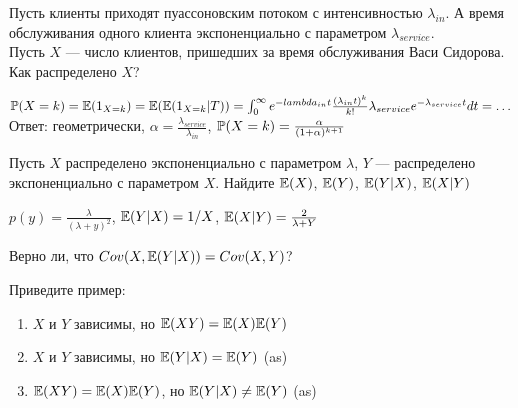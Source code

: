 \begin{problem}
Пусть клиенты приходят пуассоновским потоком с интенсивностью $\lambda_{in}$. А время обслуживания одного клиента экспоненциально с параметром $\lambda_{service}$. \\
Пусть $X$ — число клиентов, пришедших за время обслуживания Васи Сидорова. \\
Как распределено $X$?

\begin{sol}

$\P(X=k)=\E(1_{X=k})=\E(\E(1_{X=k}|T))=\int_{0}^{\infty}e^{-lambda_{in}t}\frac{(\lambda_{in}t)^{k}}{k!}\lambda_{service}e^{-\lambda_{service}t}dt=\ldots$ \\
Ответ: геометрически, $\alpha=\frac{\lambda_{service}}{\lambda_{in}}$, $\P(X=k)=\frac{\alpha}{(1+\alpha)^{k+1}}$
\end{sol}
\end{problem}

\begin{problem}
Пусть $X$ распределено экспоненциально с параметром $\lambda$, $Y$ — распределено экспоненциально с параметром $X$. Найдите $\E(X)$, $\E(Y)$, $\E(Y|X)$, $\E(X|Y)$

\begin{sol}
 $p(y)=\frac{\lambda}{(\lambda+y)^{2}}$, $\E(Y|X)=1/X$, $\E(X|Y)=\frac{2}{\lambda+Y}$
\end{sol}
\end{problem}

\begin{problem}
Верно ли, что $Cov(X,\E(Y|X))=Cov(X,Y)$?

\begin{sol}

\end{sol}
\end{problem}

\begin{problem}
Приведите пример:
\begin{enumerate}
\item $X$ и $Y$ зависимы, но $\E(XY)=\E(X)\E(Y)$
\item $X$ и $Y$ зависимы, но $\E(Y|X)=\E(Y)$ (as)
\item $\E(XY)=\E(X)\E(Y)$, но $\E(Y|X)\neq \E(Y)$ (as)
\end{enumerate}

\begin{sol}

\end{sol}
\end{problem}

